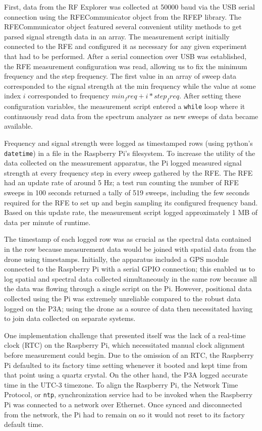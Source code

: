 \documentclass[pageno]{jpaper}
\begin{document}
First, data from the RF Explorer was collected at 50000 baud via the USB serial connection using the RFECommunicator object from the RFEP library. The RFECommunicator object featured several convenient utility methods to get parsed signal strength data in an array. The measurement script initially connected to the RFE and configured it as necessary for any given experiment that had to be performed. After a serial connection over USB was established, the RFE measurement configuration was read, allowing us to fix the minimum frequency and the step frequency. The first value in an array of sweep data corresponded to the signal strength at the min frequency while the value at some index $i$ corresponded to frequency $min_freq + i*step_freq$. After setting these configuration variables,  the measurement script entered a \texttt{while} loop where it continuously read data from the spectrum analyzer as new sweeps of data became available.

Frequency and signal strength were logged as timestamped rows (using python's \texttt{datetime}) in a file in the Raspberry Pi's filesystem. To increase the utility of the data collected on the measurement apparatus, the Pi logged measured signal strength at every frequency step in every sweep gathered by the RFE. The RFE had an update rate of around 5 Hz; a test run counting the number of RFE sweeps in 100 seconds returned a tally of 519 sweeps, including the few seconds required for the RFE to set up and begin sampling its configured frequency band. Based on this update rate, the measurement script logged approximately 1 MB of data per minute of runtime. 

The timestamp of each logged row was as crucial as the spectral data contained in the row because measurement data would be joined with spatial data from the drone using timestamps. Initially, the apparatus included a GPS module connected to the Raspberry Pi with a serial GPIO connection; this enabled us to log spatial and spectral data collected simultaneously in the same row because all the data was flowing through a single script on the Pi. However, positional data collected using the Pi was extremely unreliable compared to the robust data logged on the P3A; using the drone as a source of data then necessitated having to join data collected on separate systems.

 One implementation challenge that presented itself was the lack of a real-time clock (RTC) on the Raspberry Pi, which necessitated manual clock alignment before measurement could begin. Due to the omission of an RTC, the Raspberry Pi defaulted to its factory time setting whenever it booted and kept time from that point using a quartz crystal. On the other hand, the P3A logged accurate time in the UTC-3 timezone. To align the Raspberry Pi, the Network Time Protocol, or \texttt{ntp}, synchronization service had to be invoked when the Raspberry Pi was connected to a network over Ethernet. Once synced and disconnected from the network, the Pi had to remain on so it would not reset to its factory default time. 
\end{document}
